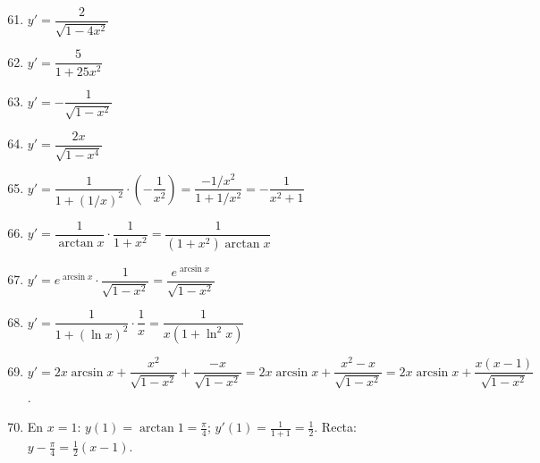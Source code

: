\documentclass[12pt, a4paper]{article}
\begin{document}
\begin{enumerate}[leftmargin=*, label=\textbf{\arabic*.}]
  \setcounter{enumi}{60}
  \item $y' = \dfrac{2}{\sqrt{1 - 4x^2}}$
  \item $y' = \dfrac{5}{1 + 25x^2}$
  \item $y' = -\dfrac{1}{\sqrt{1 - x^2}}$
  \item $y' = \dfrac{2x}{\sqrt{1 - x^4}}$
  \item $y' = \dfrac{1}{1 + (1/x)^2} \cdot \left(-\dfrac{1}{x^2}\right) = \dfrac{-1/x^2}{1 + 1/x^2} = -\dfrac{1}{x^2 + 1}$
  \item $y' = \dfrac{1}{\arctan x} \cdot \dfrac{1}{1 + x^2} = \dfrac{1}{(1 + x^2)\arctan x}$
  \item $y' = e^{\arcsin x} \cdot \dfrac{1}{\sqrt{1 - x^2}} = \dfrac{e^{\arcsin x}}{\sqrt{1 - x^2}}$
  \item $y' = \dfrac{1}{1 + (\ln x)^2} \cdot \dfrac{1}{x} = \dfrac{1}{x(1 + \ln^2 x)}$
  \item $y' = 2x\arcsin x + \dfrac{x^2}{\sqrt{1 - x^2}} + \dfrac{-x}{\sqrt{1-x^2}} = 2x\arcsin x + \dfrac{x^2 - x}{\sqrt{1 - x^2}} = 2x \arcsin x + \dfrac{x(x-1)}{\sqrt{1-x^2}}$.
  \item En $x = 1$: $y(1) = \arctan 1 = \frac{\pi}{4}$; $y'(1) = \frac{1}{1+1} = \frac{1}{2}$. Recta: $y - \frac{\pi}{4} = \frac{1}{2}(x - 1)$.
\end{enumerate}
\end{document}
